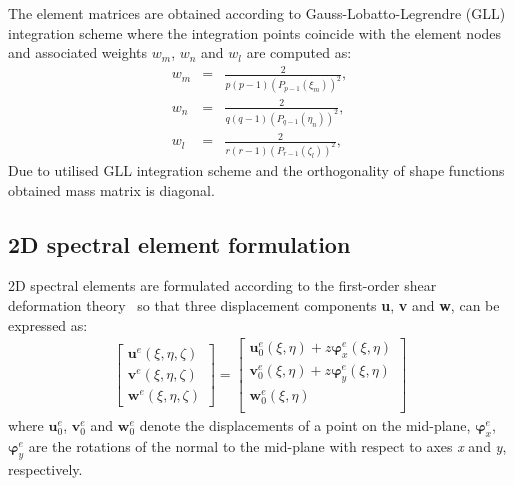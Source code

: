 \documentclass[a4paper,12pt]{article}
\begin{document}
The element matrices are obtained according to Gauss-Lobatto-Legrendre (GLL) integration scheme where the integration points coincide with the element nodes and associated weights ${w}_m$, ${w}_n$ and ${w}_l$ are computed as:
\begin{eqnarray}
{w}_m &=& \frac{2}{p(p-1)(P_{p-1}(\xi_m))^2},\nonumber\\
{w}_n &=& \frac{2}{q(q-1)(P_{q-1}(\eta_n))^2},\nonumber \\
{w}_l &=& \frac{2}{r(r-1)(P_{r-1}(\zeta_l))^2},
\label{eq:weights}
\end{eqnarray}
Due to utilised GLL integration scheme and the orthogonality of shape functions obtained mass matrix is diagonal.
\subsection{2D spectral element formulation}
\label{sec:2D_SEM}
2D spectral elements are formulated according to the first-order shear 
deformation theory~\cite{reissner1945effect, mindlin1951influence} so that 
three displacement components \textbf{u}, \textbf{v} and \textbf{w}, can be 
expressed as:
\begin{eqnarray}
\left [ \begin{array}{c}
\textbf{u}^e(\xi,\eta,\zeta) \\
\textbf{v}^e(\xi,\eta,\zeta) \\
\textbf{w}^e(\xi,\eta,\zeta)
\end{array} \right] = 
\left [ \begin{array}{c}
\textbf{u}_0^e(\xi,\eta) + z\boldsymbol{\varphi}_x^e(\xi,\eta)\\
\textbf{v}_0^e(\xi,\eta) + z\boldsymbol{\varphi}_y^e(\xi,\eta)\\
\textbf{w}_0^e(\xi,\eta) \\
\end{array} \right]
\end{eqnarray}
where $\textbf{u}_0^e$, $\textbf{v}_0^e$ and $\textbf{w}_0^e$ denote the 
displacements of a point on the mid-plane, $\boldsymbol{\varphi}_x^e$, 
$\boldsymbol{\varphi}_y^e$ are the rotations of the normal to the mid-plane 
with respect to axes \textit{x} and \textit{y}, respectively.
\end{document}
